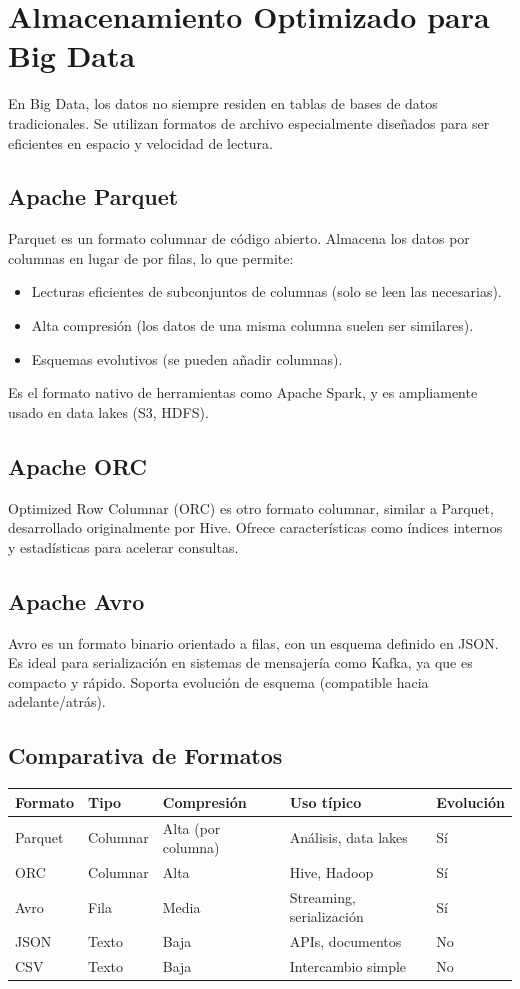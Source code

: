 \documentclass[12pt,a4paper,openany,oneside]{book}
\begin{document}
\chapter{Almacenamiento Optimizado para Big Data}
En Big Data, los datos no siempre residen en tablas de bases de datos tradicionales. Se utilizan formatos de archivo especialmente diseñados para ser eficientes en espacio y velocidad de lectura.

\section{Apache Parquet}
Parquet es un formato columnar de código abierto. Almacena los datos por columnas en lugar de por filas, lo que permite:
\begin{itemize}
    \item Lecturas eficientes de subconjuntos de columnas (solo se leen las necesarias).
    \item Alta compresión (los datos de una misma columna suelen ser similares).
    \item Esquemas evolutivos (se pueden añadir columnas).
\end{itemize}
Es el formato nativo de herramientas como Apache Spark, y es ampliamente usado en data lakes (S3, HDFS).

\section{Apache ORC}
Optimized Row Columnar (ORC) es otro formato columnar, similar a Parquet, desarrollado originalmente por Hive. Ofrece características como índices internos y estadísticas para acelerar consultas.

\section{Apache Avro}
Avro es un formato binario orientado a filas, con un esquema definido en JSON. Es ideal para serialización en sistemas de mensajería como Kafka, ya que es compacto y rápido. Soporta evolución de esquema (compatible hacia adelante/atrás).

\section{Comparativa de Formatos}
\begin{center}
\begin{tabular}{|l|l|l|l|l|}
\hline
\textbf{Formato} & \textbf{Tipo} & \textbf{Compresión} & \textbf{Uso típico} & \textbf{Evolución} \\ \hline
Parquet & Columnar & Alta (por columna) & Análisis, data lakes & Sí \\
ORC & Columnar & Alta & Hive, Hadoop & Sí \\
Avro & Fila & Media & Streaming, serialización & Sí \\
JSON & Texto & Baja & APIs, documentos & No \\
CSV & Texto & Baja & Intercambio simple & No \\ \hline
\end{tabular}
\end{center}
\end{document}

